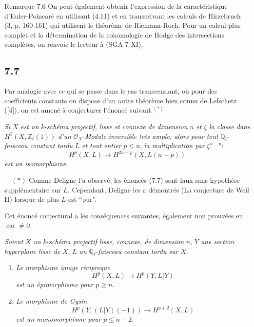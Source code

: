 \begin{statement}{Remarque 7.6}
On peut également obtenir l'expression de la caractéristique d'Euler-Poincaré en utilisant (4.11) et en transcrivant les calculs de Hirzebruch (3, p. 160-161) qui utilisent le théorème de Riemann-Roch. Pour un calcul plus complet et la détermination de la cohomologie de Hodge des intersections complètes, on renvoie le lecteur à (SGA 7 XI).
\end{statement}

\subsection*{7.7}

Par analogie avec ce qui se passe dans le cas transcendant, où pour des coefficients constants on dispose d'un autre théorème bien connu de Lefschetz ([4]), on est amené à conjecturer l'énoncé suivant.$^{(*)}$

 \emph{Si} $X$ \emph{est un} $k$-\emph{schéma projectif, lisse et connexe de dimension} $n$ \emph{et} $\xi$ \emph{la classe dans} $H^2(X,\mathbb{Z}_\ell(1))$ \emph{d'un} $\mathcal{O}_X$-\emph{Module inversible très ample, alors pour tout} $\mathbb{Q}_\ell$-\emph{faisceau constant tordu} $L$ \emph{et tout entier} $p\le n$, \emph{la multiplication par} $\xi^{n-p}$:
\[
H^p(X,L)\to H^{2n-p}(X,L(n-p))
\]
\emph{est un isomorphisme}.

\(\quad (*)\) Comme Deligne l'a observé, les énoncés (7.7) sont faux sans hypothèse supplémentaire sur $L$. Cependant, Deligne les a démontrés (La conjecture de Weil II) lorsque de plus $L$ est ``pur''.

Cet
énoncé conjectural a les conséquences suivantes, également non prouvées en $\operatorname{car}\ne0$.

\emph{Soient} $X$ \emph{un} $k$-\emph{schéma projectif lisse, connexe, de dimension} $n$, $Y$ \emph{une section hyperplane lisse de} $X$, $L$ \emph{un} $\mathbb{Q}_\ell$-\emph{faisceau constant tordu sur} $X$.
\begin{enumerate}[label=(\roman*)]
\item \emph{Le morphisme image réciproque}
\[
H^p(X,L)\to H^p(Y,L|Y)
\]
\emph{est un épimorphisme pour} $p\ge n$.
\item \emph{Le morphisme de Gysin}
\[
H^p(Y,(L|Y)(-1))\to H^{p+2}(X,L)
\]
\emph{est un monomorphisme pour} $p\le n-2$.
\end{enumerate}

